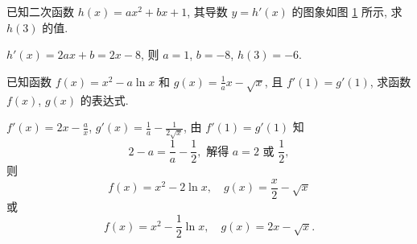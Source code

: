   \begin{exercise}
    已知二次函数 $h(x)=ax^2 +bx+1$, 其导数 $y=h'(x)$ 的图象如图 \ref{fig-190418-2120} 所示, 求 $h(3)$ 的值.
    \begin{figure}[htb]
    \small
    \centering
    \caption{}\label{fig-190418-2120}
    \end{figure}
  \end{exercise}

  \beginsolution
    $h'(x)=2ax+b=2x-8$, 则 $a=1$, $b=-8$, $h(3)=-6$.
  \endsolution
  
  \begin{exercise}
    已知函数 $f(x)=x^2 -a\ln x$ 和 $g(x)=\frac1a x-\sqrt{x}$, 
    且 $f'(1)=g'(1)$, 求函数 $f(x)$, $g(x)$ 的表达式.
  \end{exercise}
  
  \beginsolution
    $f'(x)=2x-\frac{a}x$, $g'(x)=\frac1a-\frac1{2\sqrt{x}}$, 由 $f'(1)=g'(1)$ 知 
    \[2-a=\frac1a-\frac12, \text{\ 解得\ } a=2 \text{\ 或\ } \frac12,\]
    则
    \[f(x)=x^2-2\ln x,\quad g(x)=\frac{x}2-\sqrt{x}\]
    或
    \[f(x)=x^2-\frac12\ln x,\quad g(x)=2x-\sqrt{x}.\]
  \endsolution
  
